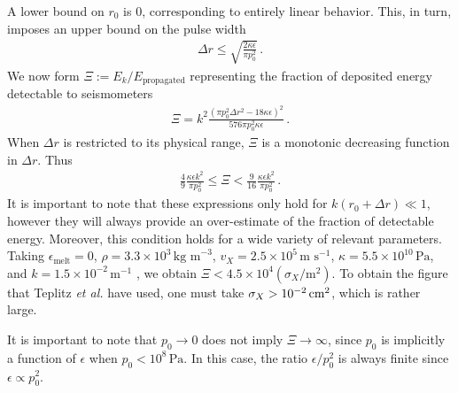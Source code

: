 \documentclass[prd,reprint,10pt]{revtex4-1}
\newcommand*\te[1]{\text{#1}}
\newcommand*\p[1]{\left(#1\right)}
\newcommand*\f[2]{\frac{#1}{#2}}
\begin{document}
A lower bound on $r_0$ is 0, corresponding to entirely linear behavior. This, in turn, imposes an upper bound on the pulse width
\begin{align}
\Delta r\leq\sqrt{\f{2\kappa \epsilon}{\pi p_0^2}}\,.
\end{align}
We now form $\Xi:=E_k/E_\te{propagated}$ representing the fraction of deposited energy detectable to seismometers
\begin{align}
\Xi = k^2\f{\p{\pi p_0^2\Delta r^2-18\kappa \epsilon}^2}{576 \pi p_0^2 \kappa \epsilon}\,.
\end{align}
When $\Delta r$ is restricted to its physical range, $\Xi$ is a monotonic decreasing function in $\Delta r$. Thus
\begin{align}
\f{4}{9}\f{\kappa\epsilon k^2}{\pi  p_0^2} \leq \Xi <\f{9}{16}\f{\kappa\epsilon k^2}{\pi  p_0^2}\,.
\end{align}
It is important to note that these expressions only hold for $k(r_0+\Delta r)\ll 1$, however they will always provide an over-estimate of the fraction of detectable energy. Moreover, this condition holds for a wide variety of relevant parameters. Taking $\epsilon_\te{melt} = 0$, $\rho = 3.3\times 10^3\,\te{kg m}^{-3}$, $v_X = 2.5\times 10^5\,\te{m s}^{-1}$, $\kappa = 5.5\times 10^{10}\,\te{Pa}$, and $k = 1.5\times 10^{-2}\,\te{m}^{-1}$ \cite{garcia2011very}, we obtain $\Xi<4.5\times 10^4 (\sigma_X/\te{m}^2)$. To obtain the figure that Teplitz \textit{et al.} have used, one must take $\sigma_X >10^{-2}\te{\,cm}^2$, which is rather large.

It is important to note that $p_0\to 0$ does not imply $\Xi\to\infty$, since $p_0$ is implicitly a function of $\epsilon$ when $p_0<10^8\,\te{Pa}$. In this case, the ratio $\epsilon/p_0^2$ is always finite since $\epsilon\propto p_0^2$.
\end{document}
